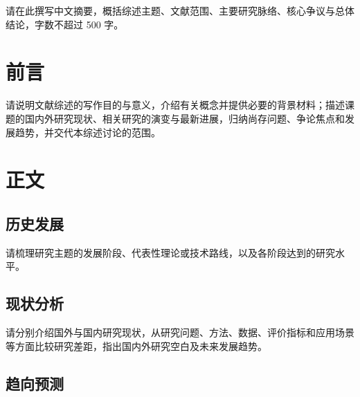 \documentclass{scutreview}
\begin{document}
\maketitle

\begin{reviewabstract}
请在此撰写中文摘要，概括综述主题、文献范围、主要研究脉络、核心争议与总体结论，字数不超过 500 字。
\end{reviewabstract}


\section{前言}

请说明文献综述的写作目的与意义，介绍有关概念并提供必要的背景材料；描述课题的国内外研究现状、相关研究的演变与最新进展，归纳尚存问题、争论焦点和发展趋势，并交代本综述讨论的范围。

\section{正文}

\subsection{历史发展}

请梳理研究主题的发展阶段、代表性理论或技术路线，以及各阶段达到的研究水平\cite{sample1}。

\subsection{现状分析}

请分别介绍国外与国内研究现状，从研究问题、方法、数据、评价指标和应用场景等方面比较研究差距，指出国内外研究空白及未来发展趋势\cite{sample2}。

\subsection{趋向预测}
\end{document}
